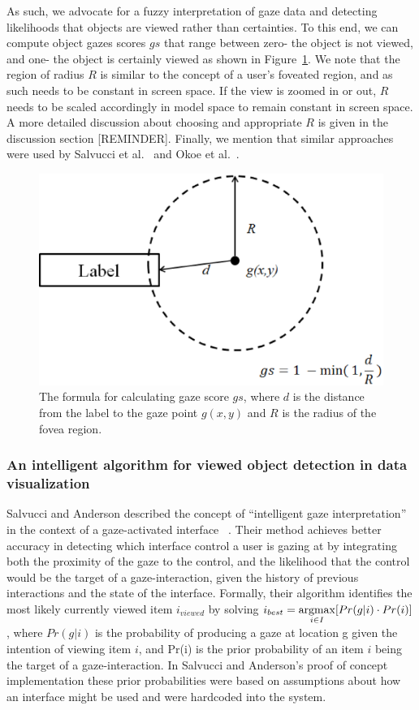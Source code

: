 As such, we advocate for a fuzzy interpretation of gaze data and detecting likelihoods that objects are viewed rather than certainties. To this end, we can compute object gazes scores $gs$ that range between zero- the object is not viewed, and one- the object is certainly viewed as shown in Figure~\ref{fig:gazeScoreFig3}. We note that the region of radius $R$ is similar to the concept of a user's foveated region, and as such needs to be constant in screen space. If the view is zoomed in or out, $R$ needs to be scaled accordingly in model space to remain constant in screen space.  A more detailed discussion about choosing and appropriate $R$ is given in the discussion section [REMINDER]. Finally, we mention that similar approaches were used by Salvucci et al.~\cite{salvucci2000intelligent} and Okoe et al.~\cite{okoe2014gaze}.
\begin{figure}[htb]
  \centering
  \includegraphics[width=\linewidth]{images/gazeScoreFig3.eps}
  \caption{The formula for calculating gaze score $gs$, where $d$ is the distance from the label to the gaze point $g(x,y)$ and $R$ is the radius of the fovea region. }
	\label{fig:gazeScoreFig3}
\end{figure}

\subsubsection{An intelligent algorithm for viewed object detection in data visualization}
Salvucci and Anderson described the concept of ``intelligent gaze interpretation'' in the context of a gaze-activated interface ~\cite{salvucci2000intelligent}. Their method achieves better accuracy in detecting which interface control a user is gazing at by integrating both the proximity of the gaze to the control, and the likelihood that the control would be the target of a gaze-interaction, given the history of previous interactions and the state of the interface. Formally, their algorithm identifies the most likely currently viewed item $i_{viewed}$ by solving $i_{best} = \displaystyle \operatorname*{argmax}_{i\in I}[Pr(g|i)\cdot Pr(i)]$ , where $Pr(g|i)$ is the probability of producing a gaze at location g given the intention of viewing item $i$, and Pr(i) is the prior probability of an item $i$  being the target of a gaze-interaction. In Salvucci and Anderson's proof of concept implementation these prior probabilities were based on assumptions about how an interface might be used and were hardcoded into the system.  


